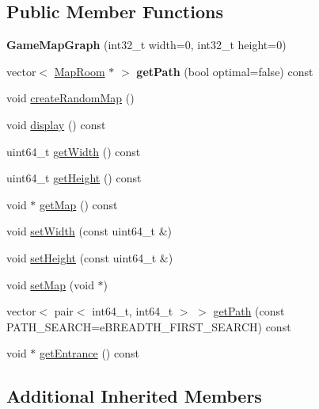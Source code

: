\subsection*{Public Member Functions}
\begin{DoxyCompactItemize}
\item 
\hypertarget{class_game_map_graph_a3152252cb8e531ae75e4b86fba45cf31}{}{\bfseries Game\+Map\+Graph} (int32\+\_\+t width=0, int32\+\_\+t height=0)\label{class_game_map_graph_a3152252cb8e531ae75e4b86fba45cf31}

\item 
\hypertarget{class_game_map_graph_a025a4d4af85e1529c00975f517caea03}{}vector$<$ \hyperlink{class_map_room}{Map\+Room} $\ast$ $>$ {\bfseries get\+Path} (bool optimal=false) const \label{class_game_map_graph_a025a4d4af85e1529c00975f517caea03}

\item 
void \hyperlink{class_game_map_graph_ac6edc57767b6e254cda08a74ae2181af}{create\+Random\+Map} ()
\item 
void \hyperlink{class_game_map_graph_a9550981dd6839568b4101b033f2d1572}{display} () const 
\item 
uint64\+\_\+t \hyperlink{class_game_map_graph_a6ebd4eb5ab90494562a4fa1fac395e9b}{get\+Width} () const 
\item 
uint64\+\_\+t \hyperlink{class_game_map_graph_a07dfd4bc26e30a22d2b13412c97aab63}{get\+Height} () const 
\item 
void $\ast$ \hyperlink{class_game_map_graph_a1248229f09100e380d984be80b53e101}{get\+Map} () const 
\item 
void \hyperlink{class_game_map_graph_a3ad14fe9fcbffbbf2f10a7001fcb7a18}{set\+Width} (const uint64\+\_\+t \&)
\item 
void \hyperlink{class_game_map_graph_aae07cb7e5bf3c212f169791991579cea}{set\+Height} (const uint64\+\_\+t \&)
\item 
void \hyperlink{class_game_map_graph_a6076fd5cff9ca9c9bd3b05f52d8e9f72}{set\+Map} (void $\ast$)
\item 
vector$<$ pair$<$ int64\+\_\+t, int64\+\_\+t $>$ $>$ \hyperlink{class_game_map_graph_a90b718efe74e0bc2c4f293a25862ee95}{get\+Path} (const P\+A\+T\+H\+\_\+\+S\+E\+A\+R\+C\+H=e\+B\+R\+E\+A\+D\+T\+H\+\_\+\+F\+I\+R\+S\+T\+\_\+\+S\+E\+A\+R\+C\+H) const 
\item 
void $\ast$ \hyperlink{class_game_map_graph_af58b1faac9bf682fef17fd93e5c364f5}{get\+Entrance} () const 
\end{DoxyCompactItemize}
\subsection*{Additional Inherited Members}


